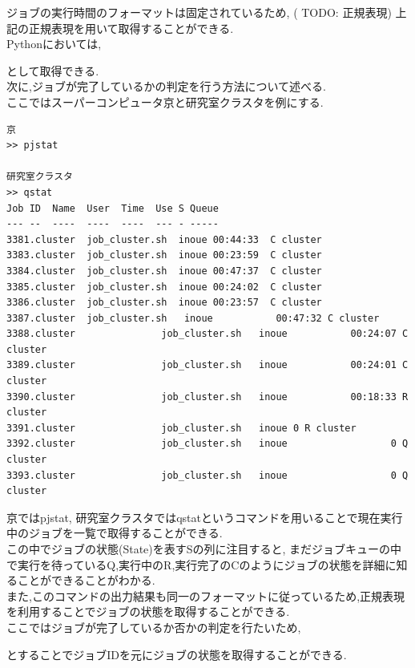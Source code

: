 ジョブの実行時間のフォーマットは固定されているため,
( TODO: 正規表現)
上記の正規表現を用いて取得することができる.\\
Pythonにおいては,
{\footnotesize

}
として取得できる.\\
次に,ジョブが完了しているかの判定を行う方法について述べる.\\
ここではスーパーコンピュータ京と研究室クラスタを例にする.\\
{\footnotesize
\begin{lstlisting}[numbers=none]
京
>> pjstat

研究室クラスタ
>> qstat
Job ID  Name  User  Time  Use S Queue
--- --  ----  ----  ----  --- - -----
3381.cluster  job_cluster.sh  inoue 00:44:33  C cluster
3383.cluster  job_cluster.sh  inoue 00:23:59  C cluster
3384.cluster  job_cluster.sh  inoue 00:47:37  C cluster
3385.cluster  job_cluster.sh  inoue 00:24:02  C cluster
3386.cluster  job_cluster.sh  inoue 00:23:57  C cluster
3387.cluster  job_cluster.sh   inoue           00:47:32 C cluster
3388.cluster               job_cluster.sh   inoue           00:24:07 C cluster
3389.cluster               job_cluster.sh   inoue           00:24:01 C cluster
3390.cluster               job_cluster.sh   inoue           00:18:33 R cluster
3391.cluster               job_cluster.sh   inoue 0 R cluster
3392.cluster               job_cluster.sh   inoue                  0 Q cluster
3393.cluster               job_cluster.sh   inoue                  0 Q cluster
\end{lstlisting}
}
京ではpjstat, 研究室クラスタではqstatというコマンドを用いることで現在実行中のジョブを一覧で取得することができる.\\
この中でジョブの状態(State)を表すSの列に注目すると, まだジョブキューの中で実行を待っているQ,実行中のR,実行完了のCのようにジョブの状態を詳細に知ることができることがわかる.\\
また,このコマンドの出力結果も同一のフォーマットに従っているため,正規表現を利用することでジョブの状態を取得することができる.\\
ここではジョブが完了しているか否かの判定を行たいため,
{\footnotesize

}
とすることでジョブIDを元にジョブの状態を取得することができる.\\

